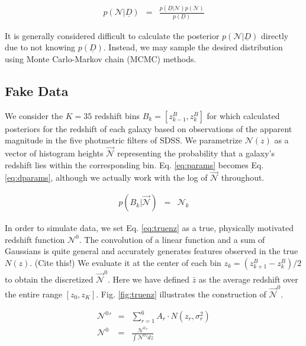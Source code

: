 \documentclass[12pt, onecolumn]{emulateapj}
\newcommand{\textul}{\underline}
\begin{document}
\begin{eqnarray}
\label{eq:bayes}
p(\mathcal{N}|\textul{D}) &=& \frac{p(\textul{D}|\mathcal{N})p(\mathcal{N})}{p(\textul{D})}
\end{eqnarray}

It is generally considered difficult to calculate the posterior $p(\mathcal{N}|\textul{D})$ directly due to not knowing $p(\textul{D})$.  Instead, we may sample the desired distribution using Monte Carlo-Markov chain (MCMC) methods.  

\subsection{Fake Data}
\label{sec:fake}

We consider the $K=35$ redshift bins $B_{k}=[z^{B}_{k-1},z^{B}_{k}]$ for which \citet{she11} calculated posteriors for the redshift of each galaxy based on observations of the apparent magnitude in the five photmetric filters of SDSS.  We parametrize $\mathcal{N}(z)$ as a vector of histogram heights $\vec{\mathcal{N}}$ representing the probability that a galaxy's redshift lies within the corresponding bin.  Eq. \ref{eq:params} becomes Eq. \ref{eq:dparams}, although we actually work with the log of $\vec{\mathcal{N}}$ throughout.  

\begin{eqnarray}
\label{eq:dparams}
p(B_{k}|\vec{\mathcal{N}}) &=& \mathcal{N}_{k}%
\end{eqnarray}

In order to simulate data, we set Eq. \ref{eq:truenz} as a true, physically motivated redshift function $\mathcal{N}^{0}$.  The convolution of a linear function and a sum of Gaussians is quite general and accurately generates features observed in the true $N(z)$.  (Cite this!)  We evaluate it at the center of each bin  $z_{k}=(z_{k+1}^{B}-z_{k}^{B})/2$ to obtain the discretized $\vec{\mathcal{N}}^{0}$.  Here we have defined $\bar{z}$ as the average redshift over the entire range $[z_{0},z_{K}]$.  Fig. \ref{fig:truenz} illustrates the construction of $\vec{\mathcal{N}}^{0}$.

\begin{mathletters}
\begin{eqnarray}
\label{eq:truenz}
\mathcal{N}^{0}' &=& \sum_{r=1}^{6}A_{r}\cdot N(z_{r},\sigma^{2}_{r})\nonumber\\
\mathcal{N}^{0} &=& \frac{\mathcal{N}^{0}'}{\int\mathcal{N}^{0}'dz}
\end{eqnarray}
\end{mathletters}
\end{document}
